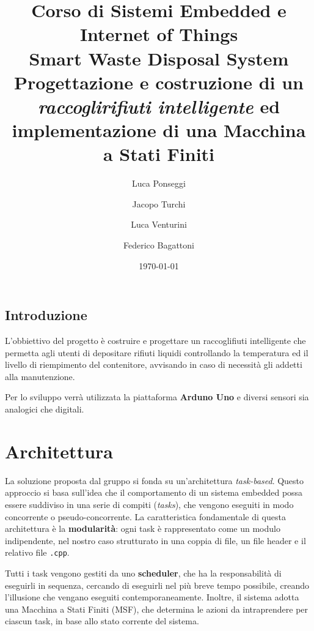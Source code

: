 \documentclass{report}
\title{
\normalsize{Corso di Sistemi Embedded e Internet of Things}\\
\Huge{Smart Waste Disposal System}\\
\vspace{0.75em}
\large{Progettazione e costruzione di un \textit{raccoglirifiuti intelligente} ed implementazione di una Macchina a Stati Finiti}
}
\author{Luca Ponseggi \and Jacopo Turchi \and Luca Venturini \and Federico Bagattoni}
\date{\today}
\begin{document}
\maketitle

\tableofcontents
\newpage
\section*{Introduzione}
\par{
L'obbiettivo del progetto è costruire e progettare un raccoglifiuti intelligente che permetta agli utenti di depositare rifiuti liquidi controllando la temperatura ed il livello di riempimento del contenitore, avvisando in caso di necessità gli addetti alla manutenzione.
}
\par{
Per lo sviluppo verrà utilizzata la piattaforma \textbf{Arduno Uno} e diversi sensori sia analogici che digitali.
}

\chapter{Architettura}
\par {
La soluzione proposta dal gruppo si fonda su un'architettura \textit{task-based}. Questo approccio si basa sull'idea che il comportamento di un sistema embedded possa essere suddiviso in una serie di compiti (\textit{tasks}), che vengono eseguiti in modo concorrente o pseudo-concorrente. La caratteristica fondamentale di questa architettura è la \textbf{modularità}: ogni task è rappresentato come un modulo indipendente, nel nostro caso strutturato in una coppia di file, un file header e il relativo file \texttt{.cpp}.
}
\par {
Tutti i task vengono gestiti da uno \textbf{scheduler}, che ha la responsabilità di eseguirli in sequenza, cercando di eseguirli nel più breve tempo possibile, creando l'illusione che vengano eseguiti contemporaneamente. Inoltre, il sistema adotta una Macchina a Stati Finiti (MSF), che determina le azioni da intraprendere per ciascun task, in base allo stato corrente del sistema.
}

\newpage
\end{document}

